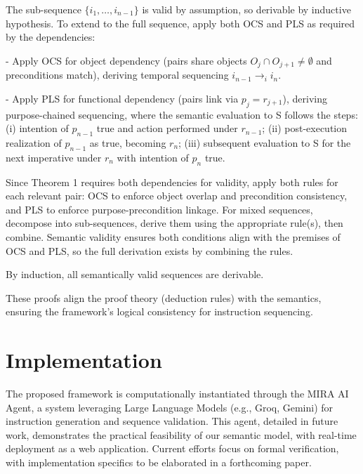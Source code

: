 \documentclass[a4paper,11pt]{lmcs}
\begin{document}
The sub-sequence \( \{i_1, \dots, i_{n-1}\} \) is valid by assumption, so derivable by inductive hypothesis. To extend to the full sequence, apply both OCS and PLS as required by the dependencies:

- Apply OCS for object dependency (pairs share objects \( O_j \cap O_{j+1} \neq \emptyset \) and preconditions match), deriving temporal sequencing \( i_{n-1} \rightarrow_i i_n \).

- Apply PLS for functional dependency (pairs link via \( p_j = r_{j+1} \)), deriving purpose-chained sequencing, where the semantic evaluation to S follows the steps: (i) intention of \( p_{n-1} \) true and action performed under \( r_{n-1} \); (ii) post-execution realization of \( p_{n-1} \) as true, becoming \( r_n \); (iii) subsequent evaluation to S for the next imperative under \( r_n \) with intention of \( p_n \) true.

Since Theorem 1 requires both dependencies for validity, apply both rules for each relevant pair: OCS to enforce object overlap and precondition consistency, and PLS to enforce purpose-precondition linkage. For mixed sequences, decompose into sub-sequences, derive them using the appropriate rule(s), then combine. Semantic validity ensures both conditions align with the premises of OCS and PLS, so the full derivation exists by combining the rules.

By induction, all semantically valid sequences are derivable.

These proofs align the proof theory (deduction rules) with the semantics, ensuring the framework's logical consistency for instruction sequencing.



\section{Implementation}
The proposed framework is computationally instantiated through the MIRA AI Agent, a system leveraging Large Language Models (e.g., Groq, Gemini) for instruction generation and sequence validation. This agent, detailed in future work, demonstrates the practical feasibility of our semantic model, with real-time deployment as a web application. Current efforts focus on formal verification, with implementation specifics to be elaborated in a forthcoming paper.


\end{document}
